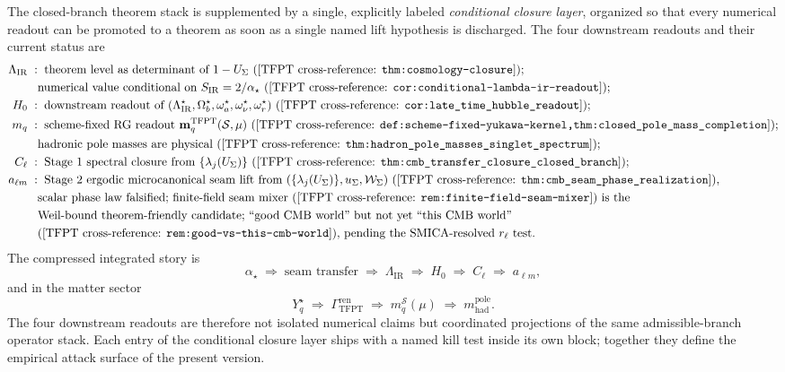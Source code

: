 The closed-branch theorem stack is supplemented by a single, explicitly labeled
\emph{conditional closure layer}, organized so that every numerical readout can be promoted to a
theorem as soon as a single named lift hypothesis is discharged. The four downstream readouts and
their current status are
\[
\begin{aligned}
\Lambda_{\mathrm{IR}}
\;&:\;\text{theorem level as determinant of $1-U_\Sigma$
(\TFPTxref{thm:cosmology-closure})};\\
&\phantom{:}\;\text{numerical value conditional on $S_{\mathrm{IR}}=2/\alpha_\star$
(\TFPTxref{cor:conditional-lambda-ir-readout})};\\
H_0
\;&:\;\text{downstream readout of $(\Lambda_{\mathrm{IR}}^\star,\Omega_b^\star,\omega_a^\star,
\omega_\nu^\star,\omega_r^\star)$ (\TFPTxref{cor:late_time_hubble_readout})};\\
m_q
\;&:\;\text{scheme-fixed RG readout
$\mathbf m_q^{\mathrm{TFPT}}(\mathcal S,\mu)$
(\TFPTxref{def:scheme-fixed-yukawa-kernel,thm:closed_pole_mass_completion})};\\
&\phantom{:}\;\text{hadronic pole masses are physical
(\TFPTxref{thm:hadron_pole_masses_singlet_spectrum})};\\
C_\ell
\;&:\;\text{Stage 1 spectral closure from $\{\lambda_j(U_\Sigma)\}$
(\TFPTxref{thm:cmb_transfer_closure_closed_branch})};\\
a_{\ell m}
\;&:\;\text{Stage 2 ergodic microcanonical seam lift from
$(\{\lambda_j(U_\Sigma)\},u_\Sigma,\mathcal W_\Sigma)$
(\TFPTxref{thm:cmb_seam_phase_realization})},\\
&\phantom{:}\;\text{scalar phase law falsified; finite-field seam mixer
(\TFPTxref{rem:finite-field-seam-mixer}) is the}\\
&\phantom{:}\;\text{Weil-bound theorem-friendly candidate;
``good CMB world'' but not yet ``this CMB world''}\\
&\phantom{:}\;\text{(\TFPTxref{rem:good-vs-this-cmb-world}), pending the
SMICA-resolved $r_\ell$ test.}
\end{aligned}
\]
The compressed integrated story is
\[
\alpha_\star
\;\Rightarrow\;
\text{seam transfer}
\;\Rightarrow\;
\Lambda_{\mathrm{IR}}
\;\Rightarrow\;
H_0
\;\Rightarrow\;
C_\ell
\;\Rightarrow\;
a_{\ell m},
\]
and in the matter sector
\[
Y_q^\star
\;\Rightarrow\;
\Gamma_{\mathrm{TFPT}}^{\mathrm{ren}}
\;\Rightarrow\;
m_q^{\mathcal S}(\mu)
\;\Rightarrow\;
m_{\mathrm{had}}^{\mathrm{pole}}.
\]
The four downstream readouts are therefore not isolated numerical claims but coordinated projections
of the same admissible-branch operator stack. Each entry of the conditional closure layer ships with
a named kill test inside its own block; together they define the empirical attack surface of the
present version.

